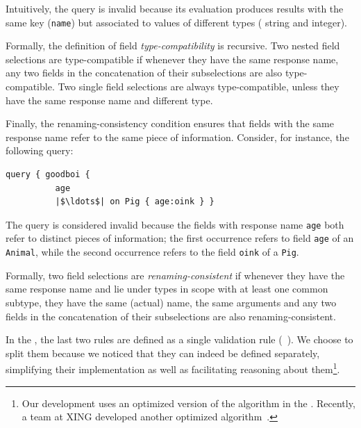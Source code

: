 \medskip
\noindent Intuitively, the query is invalid because its evaluation produces results with the same key 
(\texttt{name}) but associated to values of different types (\ie
string and integer).

Formally, the definition of field \emph{type-compatibility} is recursive. Two nested
field selections are type-compatible if whenever
they have the same response name, any two fields in the concatenation of their
subselections are also type-compatible. Two single field selections
are always type-compatible, unless they have the same response
name and different %
type.

Finally, the renaming-consistency condition ensures that fields with
the same response name refer to the same piece of
information. Consider, for instance, the following query:
\begin{verbatim}
query { goodboi {
          age   
          |$\ldots$| on Pig { age:oink } }
\end{verbatim}

\noindent The query is considered invalid because the fields with response name \texttt{age} both refer to distinct pieces of information;
the first occurrence refers to field \texttt{age} of an \texttt{Animal}, while the second
occurrence refers to the field \texttt{oink} of a \texttt{Pig}.


Formally, two field selections are \emph{renaming-consistent} if
whenever they have the same response name and lie under types in scope
with at least one common subtype,
they have the same (actual) name, the same arguments and any two
fields in the concatenation of their subselections are also
renaming-consistent.

In the \spec, the last two rules are defined as a single validation
rule (\cf~\cite[\S5.3.2]{gqlspec}). 
We choose to split them because we noticed that they can indeed be defined separately, simplifying their implementation as well as facilitating 
reasoning about them\footnote{Our \coq development uses an optimized
  version of the algorithm in the \spec. Recently, a team at XING
  developed another optimized algorithm~\cite{xingalg}.}.

